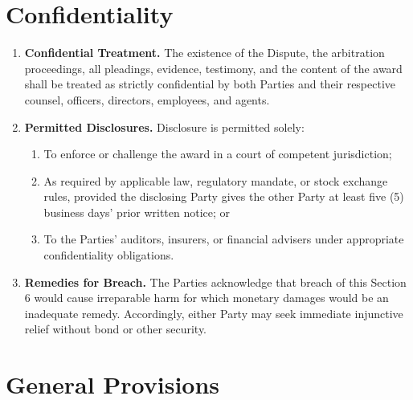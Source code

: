 \documentclass[11pt,a4paper]{article}
\begin{document}
\section{Confidentiality}

\begin{enumerate}
  \item \textbf{Confidential Treatment.} The existence of the Dispute, the
    arbitration proceedings, all pleadings, evidence, testimony, and the
    content of the award shall be treated as strictly confidential by both
    Parties and their respective counsel, officers, directors, employees,
    and agents.

  \item \textbf{Permitted Disclosures.} Disclosure is permitted solely:
    \begin{enumerate}
      \item To enforce or challenge the award in a court of competent
        jurisdiction;
      \item As required by applicable law, regulatory mandate, or stock
        exchange rules, provided the disclosing Party gives the other Party
        at least five (5) business days' prior written notice; or
      \item To the Parties' auditors, insurers, or financial advisers under
        appropriate confidentiality obligations.
    \end{enumerate}

  \item \textbf{Remedies for Breach.} The Parties acknowledge that breach of
    this Section 6 would cause irreparable harm for which monetary damages
    would be an inadequate remedy. Accordingly, either Party may seek
    immediate injunctive relief without bond or other security.
\end{enumerate}

\section{General Provisions}
\end{document}
